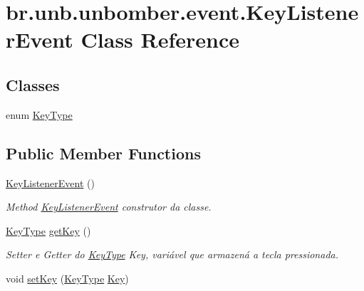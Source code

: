 \hypertarget{classbr_1_1unb_1_1unbomber_1_1event_1_1_key_listener_event}{\section{br.\+unb.\+unbomber.\+event.\+Key\+Listener\+Event Class Reference}
\label{classbr_1_1unb_1_1unbomber_1_1event_1_1_key_listener_event}
}
\subsection*{Classes}
\begin{DoxyCompactItemize}
\item 
enum \hyperlink{enumbr_1_1unb_1_1unbomber_1_1event_1_1_key_listener_event_1_1_key_type}{Key\+Type}
\end{DoxyCompactItemize}
\subsection*{Public Member Functions}
\begin{DoxyCompactItemize}
\item 
\hyperlink{classbr_1_1unb_1_1unbomber_1_1event_1_1_key_listener_event_a7d89d3058f233e8be6523eef3857ce44}{Key\+Listener\+Event} ()
\begin{DoxyCompactList}\small\item\em Method \hyperlink{classbr_1_1unb_1_1unbomber_1_1event_1_1_key_listener_event}{Key\+Listener\+Event} construtor da classe. \end{DoxyCompactList}\item 
\hyperlink{enumbr_1_1unb_1_1unbomber_1_1event_1_1_key_listener_event_1_1_key_type}{Key\+Type} \hyperlink{classbr_1_1unb_1_1unbomber_1_1event_1_1_key_listener_event_a159345c6c5e1caeda1e206b830144abd}{get\+Key} ()
\begin{DoxyCompactList}\small\item\em Setter e Getter do \hyperlink{enumbr_1_1unb_1_1unbomber_1_1event_1_1_key_listener_event_1_1_key_type}{Key\+Type} Key, variável que armazená a tecla pressionada. \end{DoxyCompactList}\item 
void \hyperlink{classbr_1_1unb_1_1unbomber_1_1event_1_1_key_listener_event_a4ebc7ecbc92d3612215544d28cd846d6}{set\+Key} (\hyperlink{enumbr_1_1unb_1_1unbomber_1_1event_1_1_key_listener_event_1_1_key_type}{Key\+Type} \hyperlink{classbr_1_1unb_1_1unbomber_1_1event_1_1_key_listener_event_a7f44c45e47d6d8f49d9a8952e08725a4}{Key})
\end{DoxyCompactItemize}
